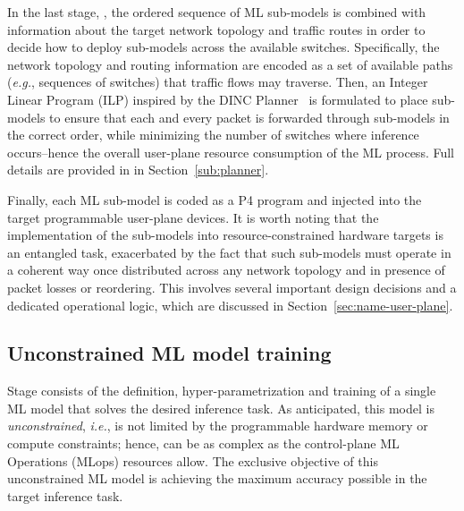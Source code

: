 \documentclass[journal]{IEEEtran}
\theoremstyle{plain} %
\newcommand{\eg}{\textit{e.g.},\xspace}
\newcommand{\ie}{\textit{i.e.},\xspace}
\newcommand*\numO[1]{\raisebox{.5pt}{\textcircled{\raisebox{-.9pt} {#1}}}}
\newcommand{\name}{\texttt{\fontsize{9}{11}\selectfont DUNE}\xspace}
\begin{document}
In the last stage, \numO{6}, the ordered sequence of ML sub-models is combined with information about the target network topology and traffic routes in order to decide how to deploy sub-models across the available switches. Specifically, the network topology and routing information are encoded as a set of available paths (\eg sequences of switches) that traffic flows may traverse. Then, an Integer Linear Program (ILP) inspired by the DINC Planner~\cite{dinc-conext23} is formulated to place sub-models to ensure that each and every packet is forwarded through sub-models in the correct order, while minimizing the number of switches where inference occurs--hence the overall user-plane resource consumption of the ML process. Full details are provided in in Section~\ref{sub:planner}.

Finally, each ML sub-model is coded as a P4 program and injected into the target programmable user-plane devices. It is worth noting that the implementation of the sub-models into resource-constrained hardware targets is an entangled task, exacerbated by the fact that such sub-models must operate in a coherent way once distributed across any network topology and in presence of packet losses or reordering. This involves several important design decisions and a dedicated operational logic, which are discussed in Section~\ref{sec:name-user-plane}.

\subsection{Unconstrained ML model training}
\label{sub:unconstrained-model}

Stage \numO{1} consists of the definition, hyper-parametrization and training of a single ML model that solves the desired inference task. As anticipated, this model is \textit{unconstrained}, \ie is not limited by the programmable hardware memory or compute constraints; hence, can be as complex as the control-plane ML Operations (MLops) resources allow. The exclusive objective of this unconstrained ML model is achieving the maximum accuracy possible in the target inference task.
\end{document}
